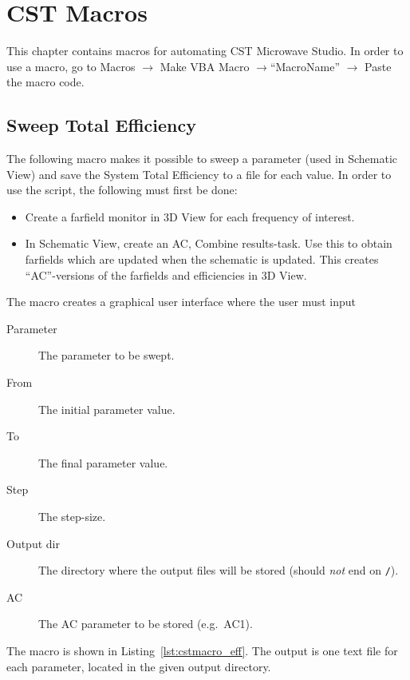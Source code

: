 \chapter{CST Macros}
\def\pil{$\rightarrow$\xspace}
This chapter contains macros for automating CST Microwave Studio. In order to use a macro, go to Macros \pil Make VBA Macro \pil ``MacroName'' \pil Paste the macro code.

\section{Sweep Total Efficiency}
The following macro makes it possible to sweep a parameter (used in Schematic View) and save the System Total Efficiency to a file for each value. In order to use the script, the following must first be done:
\begin{itemize}
    \item Create a farfield monitor in 3D View for each frequency of interest.
    \item In Schematic View, create an AC, Combine results-task. Use this to obtain farfields which are updated when the schematic is updated. This creates ``AC''-versions of the farfields and efficiencies in 3D View.
\end{itemize}
The macro creates a graphical user interface where the user must input
\begin{description}
    \item[Parameter] The parameter to be swept.
    \item[From] The initial parameter value.
    \item[To] The final parameter value.
    \item[Step] The step-size.
    \item[Output dir] The directory where the output files will be stored (should \emph{not} end on \texttt{/}).
    \item[AC] The AC parameter to be stored (e.g.\ AC1).
\end{description}
The macro is shown in Listing~\ref{lst:cstmacro_eff}. The output is one text file for each parameter, located in the given output directory.

